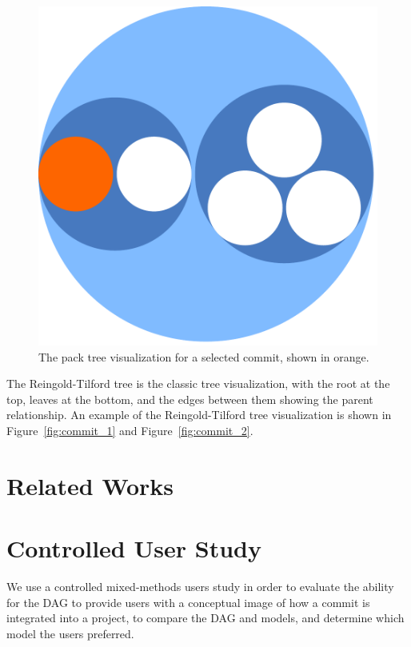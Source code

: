 \documentclass[draft]{IEEEtran}
\begin{document}
\begin{figure}[htpb]
  \centering
  \includegraphics[width=0.8\linewidth]{figures/linvis/linvis_bubble.pdf}
  \caption{The pack tree visualization for a selected commit, shown in
    orange.}
  \label{fig:linvis_pack}
\end{figure}

The Reingold-Tilford tree is the classic tree visualization, with the
root at the top, leaves at the bottom, and the edges between them
showing the parent relationship. An example of the Reingold-Tilford tree
visualization is shown in Figure~\ref{fig:commit_1} and
Figure~\ref{fig:commit_2}.


\section{Related Works}
\label{sec:related_works}



\section{Controlled User Study}
\label{sec:study}




We use a controlled mixed-methods users study in order to evaluate the
ability for the DAG to provide users with a conceptual image of how a
commit is integrated into a project, to compare the DAG and \mt models,
and determine which model the users preferred.
\end{document}
